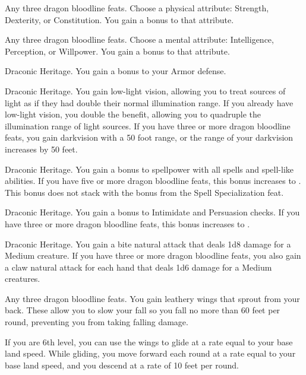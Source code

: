 \featpre Any three dragon bloodline feats.
\featben Choose a physical attribute: Strength, Dexterity, or Constitution.
You gain a  bonus to that attribute.

\featpre Any three dragon bloodline feats.
\featben Choose a mental attribute: Intelligence, Perception, or Willpower.
You gain a  bonus to that attribute.

\featpre Draconic Heritage.
\featben You gain a  bonus to your Armor defense.

\featpre Draconic Heritage.
\featben You gain low-light vision, allowing you to treat sources of light as if they had double their normal illumination range.
If you already have low-light vision, you double the benefit, allowing you to quadruple the illumination range of light sources.
If you have three or more dragon bloodline feats, you gain darkvision with a 50 foot range, or the range of your darkvision increases by 50 feet.

\featpre Draconic Heritage.
\featben You gain a  bonus to spellpower with all spells and spell-like abilities.
If you have five or more dragon bloodline feats, this bonus increases to .
This bonus does not stack with the bonus from the Spell Specialization feat.

\featpre Draconic Heritage.
\featben You gain a  bonus to Intimidate and Persuasion checks.
If you have three or more dragon bloodline feats, this bonus increases to .

\featpre Draconic Heritage.
\featben You gain a bite natural attack that deals 1d8 damage for a Medium creature.
If you have three or more dragon bloodline feats, you also gain a claw natural attack for each hand that deals 1d6 damage for a Medium creatures.

\featpre Any three dragon bloodline feats.
\featben You gain leathery wings that sprout from your back.
These allow you to slow your fall so you fall no more than 60 feet per round, preventing you from taking falling damage.

If you are 6th level, you can use the wings to glide at a rate equal to your base land speed.
While gliding, you move forward each round at a rate equal to your base land speed, and you descend at a rate of 10 feet per round.

